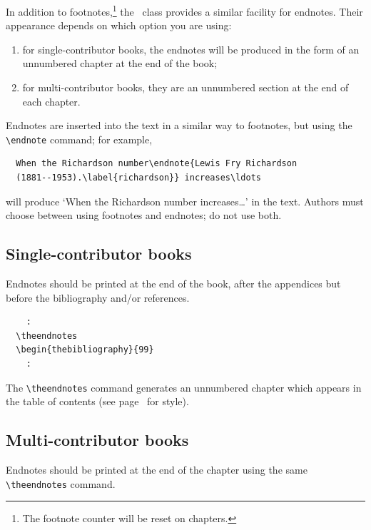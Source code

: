 In addition to footnotes,\footnote{The footnote counter will be reset on chapters.} the \cambridge\ class provides a similar facility for endnotes. Their appearance depends on which option you are using:
\begin{enumerate}
\item for single-contributor books, the endnotes will be produced in the form of an unnumbered chapter at the end of the book;
\item for multi-contributor books, they are an unnumbered section at the end of each chapter.
\end{enumerate}
Endnotes are inserted into the text in a similar way to footnotes, but using the \verb"\endnote" command; for example,
\begin{verbatim}
  When the Richardson number\endnote{Lewis Fry Richardson
  (1881--1953).\label{richardson}} increases\ldots
\end{verbatim}
will produce `When the Richardson number increases\ldots' in the text. Authors must choose between using footnotes and endnotes; do not use both.

\subsection{Single-contributor books}
Endnotes should be printed at the end of the book, after the appendices but before the bibliography and/or references.
\begin{verbatim}
    :
  \theendnotes
  \begin{thebibliography}{99}
    :
\end{verbatim}
The \verb"\theendnotes" command generates an unnumbered chapter which appears in the table of contents (see page~\pageref{richardson} for style).

\subsection{Multi-contributor books}

Endnotes should be printed at the end of the chapter using the same \verb"\theendnotes" command.

